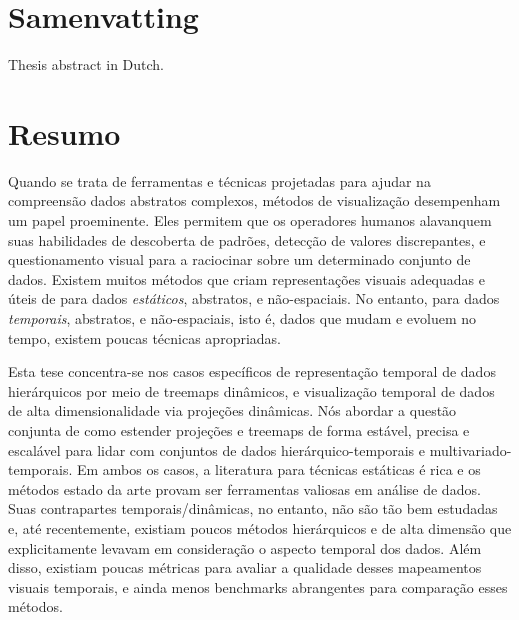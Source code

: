 \newpage


\manualmark
{} 

\chapter*{Samenvatting}

Thesis abstract in Dutch.

\newpage


\manualmark
{} 

\chapter*{Resumo}

Quando se trata de ferramentas e técnicas projetadas para ajudar na compreensão dados abstratos complexos, métodos de visualização desempenham um papel proeminente. Eles permitem que os operadores humanos alavanquem suas habilidades de descoberta de padrões, detecção de valores discrepantes, e questionamento visual para a raciocinar sobre um determinado conjunto de dados. 
Existem muitos métodos que criam representações visuais adequadas e úteis de para dados \emph{estáticos}, abstratos, e não-espaciais. No entanto, para dados \emph{temporais}, abstratos, e não-espaciais, isto é, dados que mudam e evoluem no tempo, existem poucas técnicas apropriadas.

Esta tese concentra-se nos casos específicos de representação temporal de dados hierárquicos por meio de treemaps dinâmicos, e visualização temporal de dados de alta dimensionalidade via projeções dinâmicas. Nós abordar a questão conjunta de como estender projeções e treemaps de forma estável, precisa e escalável para lidar  com conjuntos de dados hierárquico-temporais e multivariado-temporais.
Em ambos os casos, a literatura para técnicas estáticas é rica e os métodos estado da arte provam ser ferramentas valiosas em análise de dados. Suas contrapartes temporais/dinâmicas, no entanto, não são tão bem estudadas e, até recentemente, existiam poucos métodos hierárquicos e de alta dimensão que explicitamente levavam em consideração o aspecto temporal dos dados. Além disso, existiam poucas métricas para avaliar a qualidade desses mapeamentos visuais temporais, e ainda menos benchmarks abrangentes para comparação esses métodos. 

